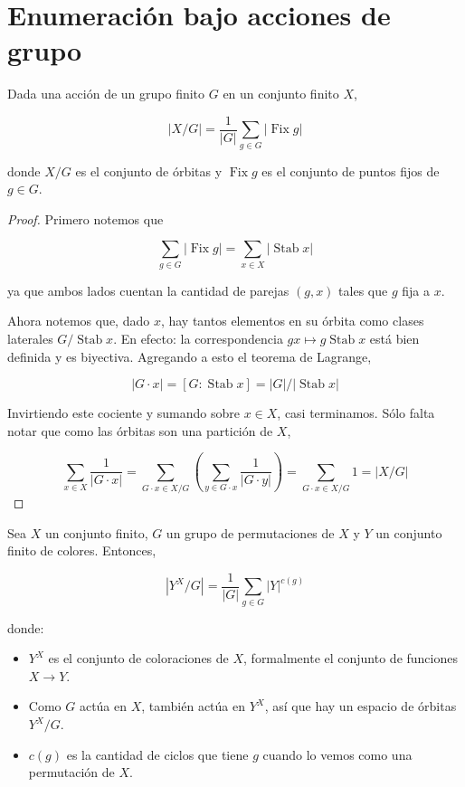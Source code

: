 \section{Enumeración bajo acciones de grupo}
\label{%
section-enumeracion-bajo-acciones-de-grupo}
\begin{theorem}
\label{theorem-combi-008}
Dada una acción de un grupo finito $G$ en un
conjunto finito $X$,

$$
|X/G| =  \frac{1}{|G|} \sum_{g\in G}|
\operatorname{Fix} g|
$$

donde $X/G$ es el conjunto de órbitas y $
\operatorname{Fix} g$ es el conjunto de
puntos fijos de $g\in G$.
\end{theorem}
\begin{proof}
Primero notemos que

$$
 \sum_{g\in G}| \operatorname{Fix} g| =
\sum_{x\in X}| \operatorname{Stab} x|
$$

ya que ambos lados cuentan la cantidad de
parejas $(g,x)$ tales que $g$ fija a $x$.

Ahora notemos que, dado $x$, hay tantos
elementos en su órbita como clases laterales
$G/ \operatorname{Stab} x$. En efecto: la
correspondencia $gx\mapsto g
\operatorname{Stab} x$ está bien definida y
es biyectiva. Agregando a esto el teorema de
Lagrange,

$$
|G\cdot x| = [G: \operatorname{Stab} x] =
|G|/| \operatorname{Stab} x|
$$

Invirtiendo este cociente y sumando sobre
$x\in X$, casi terminamos. Sólo falta notar
que como las órbitas son una partición de
$X$,

$$
 \sum_{x\in X} \frac{1}{|G\cdot x|} =
\sum_{G\cdot x\in X/G} \left( \sum_{y\in
G\cdot x} \frac{1}{|G\cdot y|} \right) =
\sum_{G\cdot x\in X/G}1 = |X/G|
$$

\end{proof}
\begin{theorem}
\label{theorem-combi-009}
Sea $X$ un conjunto finito, $G$ un grupo de
permutaciones de $X$ y $Y$ un conjunto finito
de colores. Entonces,

$$
|Y^X/G|=\frac{1}{|G|}\sum_{g\in G}|Y|^{c(g)}
$$

donde:
\begin{itemize}
\item $Y^X$ es el conjunto de coloraciones de
$X$, formalmente el conjunto de funciones
$X\to Y$.
\item Como $G$ actúa en $X$, también actúa en
$Y^X$, así que hay un espacio de órbitas
$Y^X/G$.
\item $c(g)$ es la cantidad de ciclos que
tiene $g$ cuando lo vemos como una
permutación de $X$.
\end{itemize}
\end{theorem}
